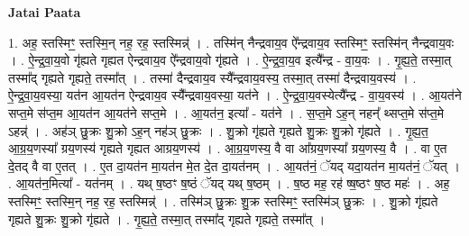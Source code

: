 \documentclass[17pt]{extarticle}
\begin{document}
\textbf{Jatai Paata} \newline

1. अह॒ स्तस्मिꣳ॒॒ स्तस्मि॒न् नह॒ रह॒ स्तस्मिन्न्॑ । . तस्मि॑न् नैन्द्रवाय॒व ऐ᳚न्द्रवाय॒व स्तस्मिꣳ॒॒ स्तस्मि॑न् नैन्द्रवाय॒वः । . ऐ॒न्द्र॒वा॒य॒वो गृ॑ह्यते गृह्यत ऐन्द्रवाय॒व ऐ᳚न्द्रवाय॒वो गृ॑ह्यते । . ऐ॒न्द्र॒वा॒य॒व इत्यै᳚न्द्र - वा॒य॒वः । . गृ॒ह्य॒ते॒ तस्मा॒त् तस्मा᳚द् गृह्यते गृह्यते॒ तस्मा᳚त् । . तस्मा॑ दैन्द्रवाय॒व स्यै᳚न्द्रवाय॒वस्य॒ तस्मा॒त् तस्मा॑ दैन्द्रवाय॒वस्य॑ । . ऐ॒न्द्र॒वा॒य॒वस्या॒ यत॑न आ॒यत॑न ऐन्द्रवाय॒व स्यै᳚न्द्रवाय॒वस्या॒ यत॑ने । . ऐ॒न्द्र॒वा॒य॒वस्येत्यै᳚न्द्र - वा॒य॒वस्य॑ । . आ॒यत॑ने सप्त॒मे स॑प्त॒म आ॒यत॑न आ॒यत॑ने सप्त॒मे । . आ॒यत॑न॒ इत्या᳚ - यत॑ने । . स॒प्त॒मे ऽह॒न् नहन्᳚ थ्सप्त॒मे स॑प्त॒मे ऽहन्न्॑ । . अह॑ञ् छु॒क्रः शु॒क्रो ऽह॒न् नह॑ञ् छु॒क्रः । . शु॒क्रो गृ॑ह्यते गृह्यते शु॒क्रः शु॒क्रो गृ॑ह्यते । . गृ॒ह्य॒त॒ आ॒ग्र॒य॒णस्या᳚ ग्रय॒णस्य॑ गृह्यते गृह्यत आग्रय॒णस्य॑ । . आ॒ग्र॒य॒णस्य॒ वै वा आ᳚ग्रय॒णस्या᳚ ग्रय॒णस्य॒ वै । . वा ए॒त दे॒तद् वै वा ए॒तत् । . ए॒त दा॒यत॑न मा॒यत॑न मे॒त दे॒त दा॒यत॑नम् । . आ॒यत॑नं॒ ॅयद् यदा॒यत॑न मा॒यत॑नं॒ ॅयत् । . आ॒यत॑न॒मित्या᳚ - यत॑नम् । . यथ् ष॒ष्ठꣳ ष॒ष्ठं ॅयद् यथ् ष॒ष्ठम् । . ष॒ष्ठ मह॒ रह॑ ष्ष॒ष्ठꣳ ष॒ष्ठ महः॑ । . अह॒ स्तस्मिꣳ॒॒ स्तस्मि॒न् नह॒ रह॒ स्तस्मिन्न्॑ । . तस्मि॑ञ् छु॒क्रः शु॒क्र स्तस्मिꣳ॒॒ स्तस्मि॑ञ् छु॒क्रः । . शु॒क्रो गृ॑ह्यते गृह्यते शु॒क्रः शु॒क्रो गृ॑ह्यते । . गृ॒ह्य॒ते॒ तस्मा॒त् तस्मा᳚द् गृह्यते गृह्यते॒ तस्मा᳚त् । \newline
\end{document}
